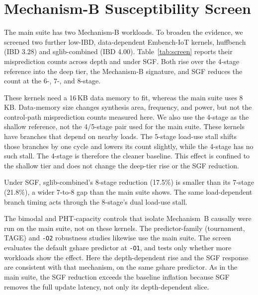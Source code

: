 \documentclass[acmsmall,nonacm,screen]{acmart}
\begin{document}
\section{Mechanism-B Susceptibility Screen}
\label{sup:screen}
The main suite has two Mechanism-B workloads. To broaden the evidence, we screened two
further low-IBD, data-dependent Embench-IoT kernels, huffbench (IBD 3.28) and
sglib-combined (IBD 4.00). Table~\ref{tab:screen} reports their misprediction counts
across depth and under SGF. Both rise over the 4-stage reference into the deep tier,
the Mechanism-B signature, and SGF reduces the count at the 6-, 7-, and 8-stage.

These kernels need a 16\,KB data memory to fit, whereas the main suite uses 8\,KB.
Data-memory size changes synthesis area, frequency, and power, but not the
control-path misprediction counts measured here. We also use the 4-stage as the
shallow reference, not the 4/5-stage pair used for the main suite. These kernels have
branches that depend on nearby loads. The 5-stage load-use stall shifts those branches
by one cycle and lowers its count slightly, while the 4-stage has no such stall. The
4-stage is therefore the cleaner baseline. This effect is confined to the shallow tier
and does not change the deep-tier rise or the SGF reduction.

Under SGF, sglib-combined's 8-stage reduction (17.5\%) is smaller than its 7-stage
(21.8\%), a wider 7-to-8 gap than the main suite shows. The same load-dependent branch
timing acts through the 8-stage's dual load-use stall.

The bimodal and PHT-capacity controls that isolate Mechanism~B causally were run on the
main suite, not on these kernels. The predictor-family (tournament, TAGE) and \texttt{-O2}
robustness studies likewise use the main suite. The screen evaluates the default gshare
predictor at \texttt{-O1}, and tests only whether more workloads show the effect. Here the
depth-dependent rise and the SGF response are consistent with that mechanism, on the same
gshare predictor. As in the main suite, the SGF reduction exceeds the baseline inflation
because SGF removes the full update latency, not only its depth-dependent slice.
\end{document}
